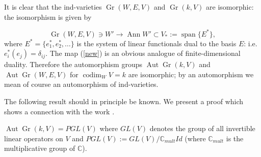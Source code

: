 \documentclass[11pt,twoside]{gsp}
\begin{document}
It is clear that the ind-varieties $\operatorname{Gr}(W,E,V)$ and $\operatorname{Gr}(k,V)$ are isomorphic: the isomorphism is given by



\begin{equation}\label{new}\tag{1}
\operatorname{Gr}(W,E,V)\ni W'  \to \operatorname{Ann}W'\subset V_* := \operatorname{span}\{E^*\},
\end{equation}	
where $E^*=\{e_1^*,e_2^*,\dots\}$ is the system of linear functionals dual to the basis $E$: i.e. $e^*_i(e_j)=\delta_{ij}$. The map (\ref{new}) is an obvious analogue of finite-dimensional duality. Therefore the automorphism groups $\operatorname{Aut}\operatorname{Gr}(k,V)$ and $\operatorname{Aut}\operatorname{Gr}(W,E,V)$ for $\operatorname{codim}_W V=k$ are isomorphic; by an automorphism we mean of course an automorphism of ind-varieties.

The following result should in principle be known. We present a proof which shows a connection with the work \cite{PT}.

\begin{proposition}
$\operatorname{Aut} \operatorname{Gr}(k,V)=PGL(V)$ where $GL(V)$ denotes the group of all invertible linear operators on $V$ and $PGL(V):= GL(V)/\mathbb{C}_{mult}Id$ (where $\mathbb C_{mult}$ is the multiplicative group of $\mathbb C$).
\end{proposition}
\end{document}
